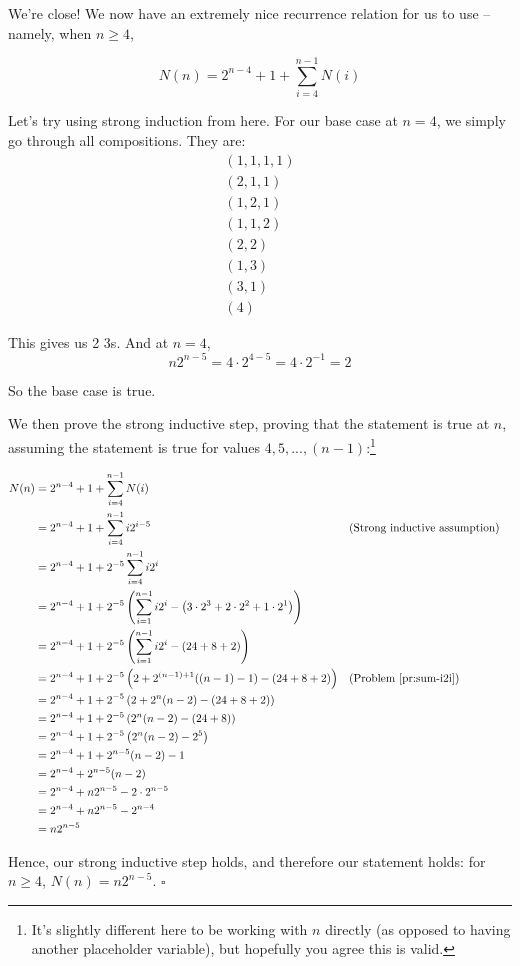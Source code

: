We're close! We now have an extremely nice recurrence relation for us to use -- namely, when $n \geq 4$,

\begin{equation}
N(n) = 2^{n-4} + 1 + \sum_{i=4}^{n-1} N(i) 
\end{equation}

Let's try using strong induction from here. For our base case at $n = 4$, we simply go through all compositions. They are:
\begin{gather*}
(1, 1, 1, 1) \\
(2, 1, 1) \\
(1, 2, 1) \\
(1, 1, 2) \\
(2, 2) \\
(1, 3) \\
(3, 1) \\
(4)
\end{gather*}

This gives us 2 3s. And at $n = 4$,
\begin{equation*}
n2^{n-5} = 4 \cdot 2^{4-5} = 4 \cdot 2^{-1} = 2
\end{equation*}

So the base case is true.

We then prove the strong inductive step, proving that the statement is true at $n$, assuming the statement is true for values $4, 5, ..., (n-1)$:\footnote{It's slightly different here to be working with $n$ directly (as opposed to having another placeholder variable), but hopefully you agree this is valid.}

\begin{align*}
N(n) &= 2^{n-4} + 1 + \sum_{i=4}^{n-1} N(i) \\
&= 2^{n-4} + 1 + \sum_{i=4}^{n-1} i2^{i-5} && \text{(Strong inductive assumption)} \\
&= 2^{n-4} + 1 + 2^{-5} \sum_{i=4}^{n-1} i2^{i} \\
&= 2^{n-4} + 1 + 2^{-5} \left(\sum_{i=1}^{n-1} i2^{i} - \left( 3 \cdot 2^3 + 2 \cdot 2^2 + 1 \cdot 2^1 \right) \right) \\
&= 2^{n-4} + 1 + 2^{-5} \left(\sum_{i=1}^{n-1} i2^{i} - (24 + 8 + 2) \right) \\
&= 2^{n-4} + 1 + 2^{-5} \left(2 + 2^{(n-1)+1}((n-1)-1) - (24 + 8 + 2) \right) && \text{(Problem \ref{pr:sum-i2i})} \\
&= 2^{n-4} + 1 + 2^{-5} \left(2 + 2^{n}(n-2) - (24 + 8 + 2) \right) \\
&= 2^{n-4} + 1 + 2^{-5} \left(2^{n}(n-2) - (24 + 8) \right) \\
&= 2^{n-4} + 1 + 2^{-5} \left(2^{n}(n-2) - 2^5 \right) \\
&= 2^{n-4} + 1 + 2^{n-5}(n-2) - 1 \\
&= 2^{n-4} + 2^{n-5}(n-2) \\
&= 2^{n-4} + n2^{n-5} - 2 \cdot 2^{n-5} \\
&= 2^{n-4} + n2^{n-5} - 2^{n-4} \\
&= n2^{n-5}
\end{align*}

Hence, our strong inductive step holds, and therefore our statement holds: for $n \geq 4$, $N(n) = n2^{n-5}$. $\square$


